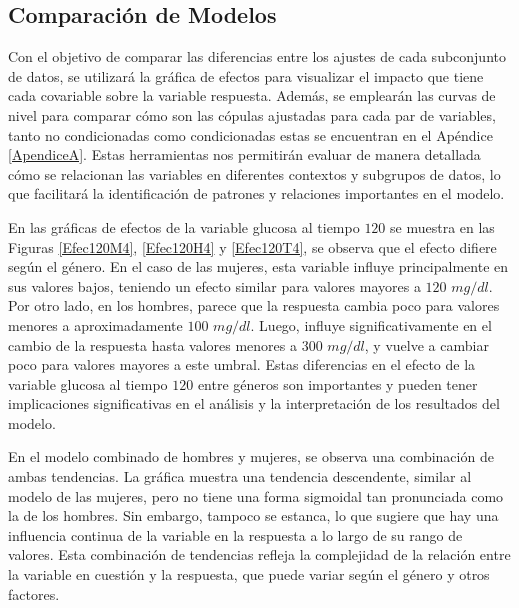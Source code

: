 
\subsection{Comparación de Modelos}

Con el objetivo de comparar las diferencias entre los ajustes de cada subconjunto de datos, se utilizará la gráfica de efectos para visualizar el impacto que tiene cada covariable sobre la variable respuesta. Además, se emplearán las curvas de nivel para comparar cómo son las cópulas ajustadas para cada par de variables, tanto no condicionadas como condicionadas estas se encuentran en el Apéndice \ref{ApendiceA}. Estas herramientas nos permitirán evaluar de manera detallada cómo se relacionan las variables en diferentes contextos y subgrupos de datos, lo que facilitará la identificación de patrones y relaciones importantes en el modelo.

En las gráficas de efectos de la variable glucosa al tiempo $120$ se muestra en las Figuras \ref{Efec120M4}, \ref{Efec120H4} y \ref{Efec120T4}, se observa que el efecto difiere según el género. En el caso de las mujeres, esta variable influye principalmente en sus valores bajos, teniendo un efecto similar para valores mayores a $120$ $mg/dl$. Por otro lado, en los hombres, parece que la respuesta cambia poco para valores menores a aproximadamente $100$ $mg/dl$. Luego, influye significativamente en el cambio de la respuesta hasta valores menores a $300$ $mg/dl$, y vuelve a cambiar poco para valores mayores a este umbral. Estas diferencias en el efecto de la variable glucosa al tiempo $120$ entre géneros son importantes y pueden tener implicaciones significativas en el análisis y la interpretación de los resultados del modelo.

En el modelo combinado de hombres y mujeres, se observa una combinación de ambas tendencias. La gráfica muestra una tendencia descendente, similar al modelo de las mujeres, pero no tiene una forma sigmoidal tan pronunciada como la de los hombres. Sin embargo, tampoco se estanca, lo que sugiere que hay una influencia continua de la variable en la respuesta a lo largo de su rango de valores. Esta combinación de tendencias refleja la complejidad de la relación entre la variable en cuestión y la respuesta, que puede variar según el género y otros factores.

